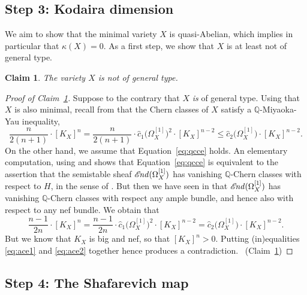 \documentclass[JEP,XML,SOM,Unicode,published]{cedram}
\let\scr\mathscr
\theoremstyle{plain}
\newtheorem{claim}[thm]{Claim}
\theoremstyle{definition}
\numberwithin{equation}{thm}
\numberwithin{enumi}{thm}
\DeclareMathOperator{\sEnd}{\sE\negthinspace \mathit{nd}}
\newcommand{\sE}{\scr{E}}
\newcommand{\bQ}{\mathbb{Q}}
\let\what\widehat
\begin{document}
\subsection*{Step 3: Kodaira dimension}

We aim to show that the minimal variety $X$ is quasi-Abelian, which implies in
particular that $\kappa(X)=0$. As a first step, we show that $X$ is at least not of
general type.

\begin{claim}\label{claim:ngen}
The variety $X$ is not of general type.
\end{claim}
\begin{proof}[Proof of Claim~\ref{claim:ngen}]
Suppose to the contrary that $X$ \emph{is} of general type. Using that $X$ is
also minimal, recall from \cite[Th.\,1.1]{GKPT19b} that the Chern classes of
$X$ satisfy a $\bQ$-Miyaoka-Yau inequality,
\begin{equation}\label{eq:ace1}
\frac{n}{2(n+1)}\cdot [K_X]^n = %
\frac{n}{2(n+1)}\cdot \what{c}_1\bigl(\Omega^{[1]}_X \bigr)^2\cdot [K_X]^{n-2} %
\leq \what{c}_2\bigl(\Omega^{[1]}_X \bigr)\cdot [K_X]^{n-2}.
\end{equation}
On the other hand, we assume that Equation~\eqref{eq:qcce} holds. An
elementary computation, using \cite[(1.14) on p.\,34]{Kob87} and
\cite[\S 3.8]{GKPT19b} shows that Equation~\eqref{eq:qcce} is equivalent to
the assertion that the semistable sheaf $\sEnd(\Omega^{[1]}_X)$ has vanishing
$\bQ$-Chern classes with respect to $H$, in the sense of
\cite[Defn.~6.1]{GKPT19}. But then we have seen in \cite[Fact and
Defn.~6.5]{GKPT19} that $\sEnd(\Omega^{[1]}_X)$ has vanishing $\bQ$-Chern classes
with respect any ample bundle, and hence also with respect to any nef bundle.
We obtain that
\begin{equation}\label{eq:ace2}
\frac{n-1}{2n}\cdot [K_X]^n %
= \frac{n-1}{2n}\cdot \what{c}_1 \bigl(\Omega^{[1]}_X \bigr)^2\cdot [K_X]^{n-2} %
= \what{c}_2 \bigl(\Omega^{[1]}_X \bigr)\cdot [K_X]^{n-2}.
\end{equation}
But we know that $K_X$ is big and nef, so that $[K_X]^n > 0$. Putting
(in)equalities \eqref{eq:ace1} and \eqref{eq:ace2} together hence produces a
contradiction. \qedhere~\mbox{(Claim~\ref{claim:ngen})}
\end{proof}

\subsection*{Step 4: The Shafarevich map}
\end{document}
